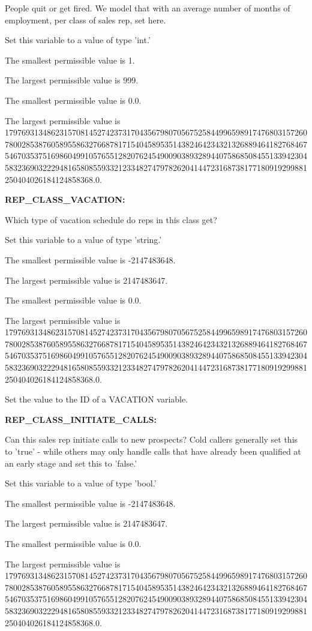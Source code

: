 People quit or get fired.  We model that with an average number of months of employment, per class of sales rep, set here.

Set this variable to a value of type 'int.'

The smallest permissible value is 1.

The largest permissible value is 999.

The smallest permissible value is 0.0.

The largest permissible value is 179769313486231570814527423731704356798070567525844996598917476803157260780028538760589558632766878171540458953514382464234321326889464182768467546703537516986049910576551282076245490090389328944075868508455133942304583236903222948165808559332123348274797826204144723168738177180919299881250404026184124858368.0.


\textbf{REP\_CLASS\_VACATION:}


Which type of vacation schedule do reps in this class get?

Set this variable to a value of type 'string.'

The smallest permissible value is -2147483648.

The largest permissible value is 2147483647.

The smallest permissible value is 0.0.

The largest permissible value is 179769313486231570814527423731704356798070567525844996598917476803157260780028538760589558632766878171540458953514382464234321326889464182768467546703537516986049910576551282076245490090389328944075868508455133942304583236903222948165808559332123348274797826204144723168738177180919299881250404026184124858368.0.

Set the value to the ID of a VACATION variable.


\textbf{REP\_CLASS\_INITIATE\_CALLS:}


Can this sales rep initiate calls to new prospects?  Cold callers generally set this to 'true' - while others may only handle calls that have already been qualified at an early stage and set this to 'false.'

Set this variable to a value of type 'bool.'

The smallest permissible value is -2147483648.

The largest permissible value is 2147483647.

The smallest permissible value is 0.0.

The largest permissible value is 179769313486231570814527423731704356798070567525844996598917476803157260780028538760589558632766878171540458953514382464234321326889464182768467546703537516986049910576551282076245490090389328944075868508455133942304583236903222948165808559332123348274797826204144723168738177180919299881250404026184124858368.0.

